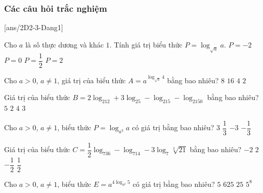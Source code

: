 \subsubsection{Các câu hỏi trắc nghiệm}

[ans/2D2-3-Dang1]

\begin{ex}%
	Cho $a$ là số thực dương và khác $1$. Tính giá trị biểu thức $P=\log_{\sqrt{a}}a$. 
	\choice
	{$P=-2$}
	{$P=0$}
	{$P=\dfrac{1}{2}$}
	{\True $P=2$}
\end{ex}

\begin{ex}%
	Cho $a>0$, $a\neq 1$, giá trị của biểu thức $A=a^{\log_{\sqrt{a}}4}$ bằng bao nhiêu?
	\choice
	{$8$}
	{\True $16$}
	{$4$}
	{$2$}
\end{ex}

\begin{ex}%
	Giá trị của biểu thức $B=2\log_212+3\log_25-\log_215-\log_2150$ bằng bao nhiêu?
	\choice
	{$5$}
	{$2$}
	{$4$}
	{\True $3$}
\end{ex}

\begin{ex}%
	Cho $a>0$, $a\neq 1$, biểu thức $P=\log_{a^3}a$ có giá trị bằng bao nhiêu?
	\choice
	{$3$}
	{\True $\dfrac{1}{3}$}
	{$-3$}
	{$-\dfrac{1}{3}$}
\end{ex}

\begin{ex}%
	Giá trị của biểu thức $C=\dfrac{1}{2}\log_736-\log_714-3\log_7\sqrt[3]{21}$ bằng bao nhiêu?
	\choice
	{\True $-2$}
	{$2$}
	{$-\dfrac{1}{2}$}
	{$\dfrac{1}{2}$}
\end{ex}

\begin{ex}%
	Cho $a>0$, $a\neq 1$, biểu thức $E=a^{4\log_{a^2}5}$ có giá trị bằng bao nhiêu?
	\choice
	{$5$}
	{$625$}
	{\True $25$}
	{$5^8$}
\end{ex}

